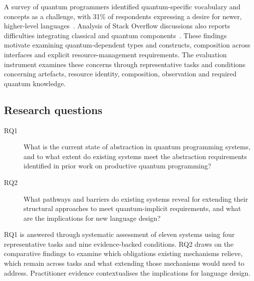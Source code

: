 A survey of quantum programmers identified quantum-specific vocabulary and concepts as a challenge, with 31\% of respondents expressing a desire for newer, higher-level languages~\cite{ferreira2024qplusage}.
Analysis of Stack Overflow discussions also reports difficulties integrating classical and quantum components~\cite{stackoverflowqc2026}.
These findings motivate examining quantum-dependent types and constructs, composition across interfaces and explicit resource-management requirements.
The evaluation instrument examines these concerns through representative tasks and conditions concerning artefacts, resource identity, composition, observation and required quantum knowledge.

\subsection{Research questions}\label{subsec:introduction:research_questions}
\begin{description}
    \item[RQ1] What is the current state of abstraction in quantum programming systems, and to what extent do existing systems meet the abstraction requirements identified in prior work on productive quantum programming?
    \item[RQ2] What pathways and barriers do existing systems reveal for extending their structural approaches to meet quantum-implicit requirements, and what are the implications for new language design?
\end{description}

RQ1 is answered through systematic assessment of eleven systems using four representative tasks and nine evidence-backed conditions.
RQ2 draws on the comparative findings to examine which obligations existing mechanisms relieve, which remain across tasks and what extending those mechanisms would need to address.
Practitioner evidence contextualises the implications for language design.

